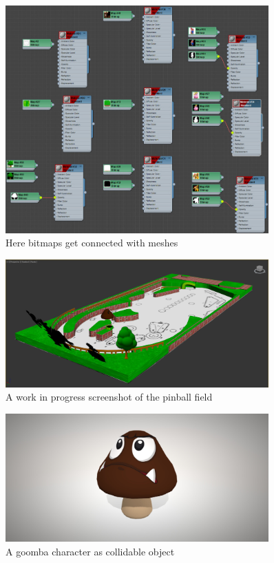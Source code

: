 \documentclass[11.5pt,oneside,a4paper]{scrartcl}
\newcounter{ct}
\begin{document}
\begin{figure}
	\centering
	\includegraphics[width=0.90\textwidth]{texturing.jpg}
	\caption{Here bitmaps get connected with meshes}
	\label{fig:texturing}
	\vspace{0.1cm}
\end{figure}

\begin{figure}
	\centering
	\includegraphics[width=0.90\textwidth]{pinballinprogress.jpg}
	\caption{A work in progress screenshot of the pinball field}
	\label{fig:pinballinprogress}
	\vspace{0.1cm}
\end{figure}

\begin{figure}
	\centering
	\includegraphics[width=0.90\textwidth]{goomba.jpg}
	\caption{A goomba character as collidable object}
	\label{fig:goomba}
	\vspace{0.1cm}
\end{figure}
\end{document}
